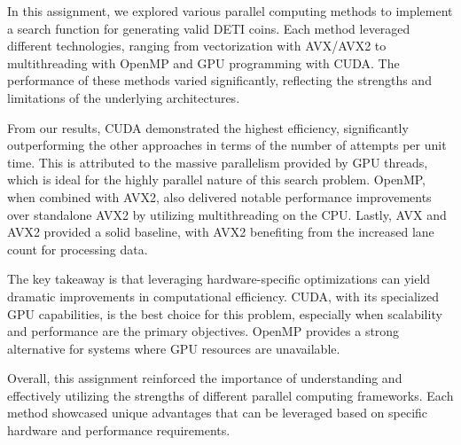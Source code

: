 \documentclass[a4paper,12pt]{article}
\begin{document}
In this assignment, we explored various parallel computing methods to implement a search function for generating valid DETI coins. Each method leveraged different technologies, ranging from vectorization with AVX/AVX2 to multithreading with OpenMP and GPU programming with CUDA. The performance of these methods varied significantly, reflecting the strengths and limitations of the underlying architectures.

From our results, CUDA demonstrated the highest efficiency, significantly outperforming the other approaches in terms of the number of attempts per unit time. This is attributed to the massive parallelism provided by GPU threads, which is ideal for the highly parallel nature of this search problem. OpenMP, when combined with AVX2, also delivered notable performance improvements over standalone AVX2 by utilizing multithreading on the CPU. Lastly, AVX and AVX2 provided a solid baseline, with AVX2 benefiting from the increased lane count for processing data.

The key takeaway is that leveraging hardware-specific optimizations can yield dramatic improvements in computational efficiency. CUDA, with its specialized GPU capabilities, is the best choice for this problem, especially when scalability and performance are the primary objectives. OpenMP provides a strong alternative for systems where GPU resources are unavailable.

Overall, this assignment reinforced the importance of understanding and effectively utilizing the strengths of different parallel computing frameworks. Each method showcased unique advantages that can be leveraged based on specific hardware and performance requirements.
\end{document}
